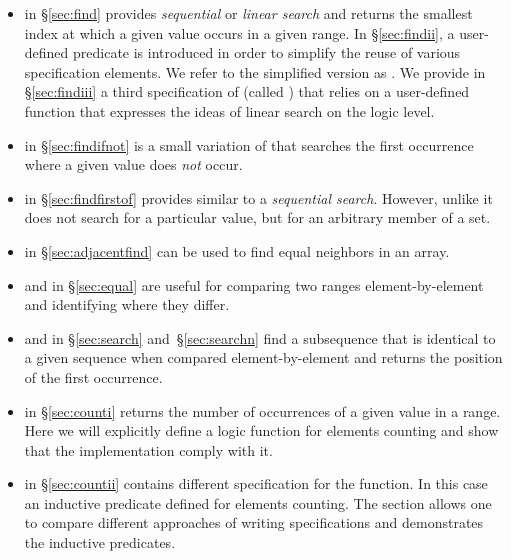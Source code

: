 \begin{itemize}
\item \find in \S\ref{sec:find}
  provides \emph{sequential} or \emph{linear search}
  and returns the smallest index at which a given value occurs in a given range.
  In \S\ref{sec:findii}, a user-defined \acsl predicate is introduced in order to 
  simplify the reuse of various specification elements.
  We refer to the simplified version as \findii.
  We provide in \S\ref{sec:findiii} a third specification of \find (called \findiii)
  that relies on a user-defined \acsl function that expresses the ideas of 
  linear search on the logic level.

\item \findifnot in \S\ref{sec:findifnot} is a small variation of \find
that searches the first occurrence where a given value does \emph{not} occur.

\item \findfirstof in \S\ref{sec:findfirstof} 
  provides similar to \find a \emph{sequential search}.
  However, unlike \find 
  it does not search for a particular value, 
        but for an arbitrary member of a set.

\item \adjacentfind in \S\ref{sec:adjacentfind}
can be used to find equal neighbors in an array.

\item \equal and \mismatch in \S\ref{sec:equal} are useful for
comparing two ranges element-by-element and identifying where they differ. 

\item \search and \searchn in \S\ref{sec:search} and~\S\ref{sec:searchn}
find a subsequence that is identical to a given sequence
when compared element-by-element and returns the position of the first occurrence.

\item \counti in \S\ref{sec:counti} returns
the number of occurrences of a given value in a range.
Here we will explicitly define a logic function for elements
counting and show that the implementation comply with it.

\item \countii in \S\ref{sec:countii} contains
different specification for the \counti function. In this case an
inductive predicate defined for elements counting. The section allows
one to compare different approaches of writing specifications and
demonstrates the \acsl inductive predicates.

\end{itemize}

\clearpage














